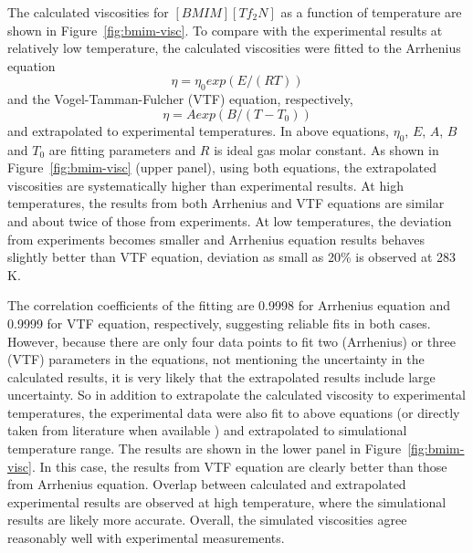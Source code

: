 \documentclass[12pt]{article}
\begin{document}
The calculated viscosities for $[BMIM][Tf_2N]$ as a function of temperature are shown in Figure~\ref{fig:bmim-visc}.
To compare with the experimental results at relatively low temperature,
the calculated viscosities were fitted to the Arrhenius equation
\begin{equation}
{\eta = \eta_0 exp(E/(RT))     }
\label{eq:ARR}
\end{equation}
and the Vogel-Tamman-Fulcher (VTF) equation,
\cite{VTF}
respectively,
\begin{equation}
{\eta = A exp(B/(T-T_0))  }
\label{eq:VTF}
\end{equation}
and extrapolated to experimental temperatures.
In above equations,
$\eta_0$, $E$, $A$, $B$ and $T_0$ are fitting parameters and $R$ is ideal gas molar constant.
As shown in Figure~\ref{fig:bmim-visc} (upper panel),
using both equations,
the extrapolated viscosities are systematically higher than experimental results.
\cite{Gadzuric.JCED.57.1072.2012,
Katsuta.JCED.55.1588.2010,
Watanabe.JPCB.110.19593.2006,
Majer.GC.8.172.2006,
Watanabe.JPCB.109.6103.2005,
VanderNoot.JEC.568.167.2004}
At high temperatures,
the results from both Arrhenius and VTF equations are similar 
and about twice of those from experiments.
At low temperatures, the deviation from experiments becomes smaller
and Arrhenius equation results behaves slightly better than VTF equation,
deviation as small as 20\% is observed at 283 K.

The correlation coefficients of the fitting are 0.9998 for Arrhenius equation and 0.9999 for VTF equation, respectively,
suggesting reliable fits in both cases.
However, because there are only four data points to fit two (Arrhenius) or three (VTF) parameters in the equations,
not mentioning the uncertainty in the calculated results,
it is very likely that the extrapolated results include large uncertainty.
So in addition to extrapolate the calculated viscosity to experimental temperatures,
the experimental data were also fit to above equations (or directly taken from literature when available
\cite{Gadzuric.JCED.57.1072.2012,
Katsuta.JCED.55.1588.2010,
Majer.GC.8.172.2006,
Watanabe.JPCB.109.6103.2005})
and extrapolated to simulational temperature range.
The results are shown in the lower panel in Figure~\ref{fig:bmim-visc}.
In this case,
the results from VTF equation are clearly better than those from Arrhenius equation.
Overlap between calculated and extrapolated experimental results are observed at high temperature,
where the simulational results are likely more accurate.
Overall, the simulated viscosities agree reasonably well with experimental measurements.
\end{document}
